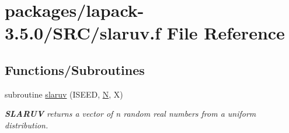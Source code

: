 \hypertarget{slaruv_8f}{}\section{packages/lapack-\/3.5.0/\+S\+R\+C/slaruv.f File Reference}
\label{slaruv_8f}
\subsection*{Functions/\+Subroutines}
\begin{DoxyCompactItemize}
\item 
subroutine \hyperlink{group__auxOTHERauxiliary_ga5ca61f3556928fc2698683460395d96c}{slaruv} (I\+S\+E\+E\+D, \hyperlink{polmisc_8c_a0240ac851181b84ac374872dc5434ee4}{N}, X)
\begin{DoxyCompactList}\small\item\em {\bfseries S\+L\+A\+R\+U\+V} returns a vector of n random real numbers from a uniform distribution. \end{DoxyCompactList}\end{DoxyCompactItemize}
